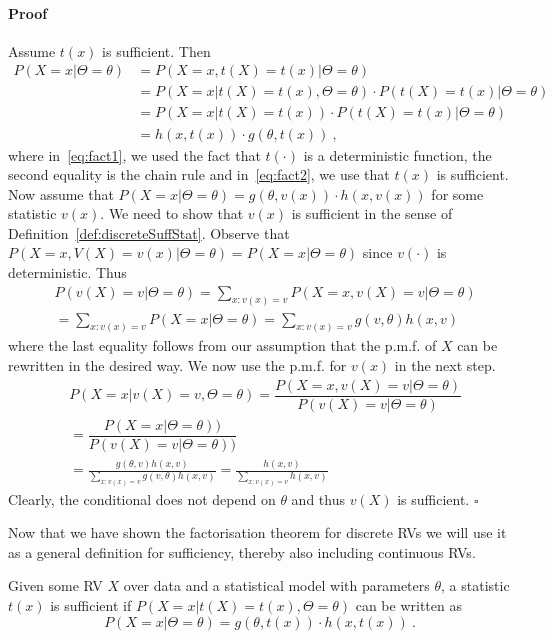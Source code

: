 \paragraph{Proof} Assume $ t(x) $ is sufficient. Then
\begin{align}
P(X = x | \Theta = \theta) &= P(X=x, t(X)=t(x) | \Theta = \theta) \label{eq:fact1}\\ 
&= P(X=x|t(X) = t(x), \Theta=\theta) \cdot P(t(X) = t(x)| \Theta = \theta)\\
&= P(X=x|t(X) = t(x)) \cdot P(t(X) = t(x)| \Theta = \theta) \label{eq:fact2}\\
&= h(x, t(x)) \cdot g(\theta, t(x)) \ , \nonumber
\end{align}
where in~\eqref{eq:fact1}, we used the fact that $t(\cdot)$ is a deterministic function, the second equality is the chain rule and in~\eqref{eq:fact2}, we use that $t(x)$ is sufficient.
Now assume that $ P(X = x | \Theta = \theta) = g(\theta, v(x)) \cdot h(x, v(x)) $ for some statistic $ v(x) $. We need to show
that $ v(x) $ is sufficient in the sense of Definition~\ref{def:discreteSuffStat}. Observe that $ P(X=x,V(X)=v(x)|\Theta = \theta) = P(X=x|\Theta = \theta) $
since $ v(\cdot) $ is deterministic. Thus
\begin{align}
&P(v(X)= v| \Theta = \theta) = \sum_{x:v(x)=v}P(X=x,v(X)=v| \Theta = \theta) \\
&= \sum_{x:v(x)=v}P(X=x | \Theta = \theta) = \sum_{x:v(x)=v} g(v, \theta) h(x,v) \nonumber
\end{align}
where the last equality follows from our assumption that the p.m.f. of $ X $ can be rewritten in the desired way. We now use the p.m.f. for $ v(x) $
in the next step.
\begin{align}
&P(X=x|v(X) = v, \Theta=\theta) = \dfrac{P(X=x,v(X)= v|\Theta = \theta)}{P(v(X) = v|\Theta = \theta)} \\
&= \dfrac{P(X=x|\Theta = \theta))}{P(v(X) = v|\Theta = \theta))}  \\
&= \frac{g(\theta, v)h(x, v)}{\sum_{x:v(x)=v} g(v, \theta) h(x,v)}
= \frac{h(x, v)}{\sum_{x:v(x)=v} h(x,v)}
\end{align}
Clearly, the conditional does not depend on $\theta $ and thus $ v(X) $ is sufficient. $ \square $ \bigskip


Now that we have shown the factorisation theorem for discrete RVs we will use it as a general definition for sufficiency, thereby
also including continuous RVs.
\begin{Definition}
Given some RV $ X $ over data and a statistical model with parameters $ \theta $, 
a statistic $ t(x) $ is sufficient if $ P(X=x|t(X) = t(x), \Theta = \theta) $ can be written as
$$ P(X = x | \Theta = \theta) = g(\theta, t(x)) \cdot h(x, t(x)) \ . $$
\end{Definition}

